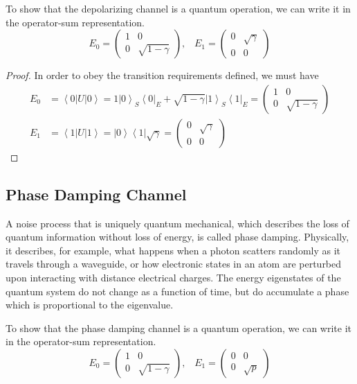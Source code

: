 \documentclass{article}
\newcommand{\ket}[1]{\ensuremath{\left|#1\right\rangle}}
\newcommand{\bra}[1]{\ensuremath{\left\langle#1\right|}}
\begin{document}
      \begin{lemma}
        To show that the depolarizing channel is a quantum operation, we can write it in the operator-sum representation. 
        \begin{equation}
          E_0 = \begin{pmatrix} 1 & 0 \\ 0 & \sqrt{1 - \gamma} \end{pmatrix}, \;\;\; E_1 = \begin{pmatrix} 0 & \sqrt{\gamma} \\ 0 & 0 \end{pmatrix}
        \end{equation}
      \end{lemma}
      \begin{proof}
        In order to obey the transition requirements defined, we must have 
        \begin{align}
          E_0 & = \bra{0} U \ket{0} = 1 \ket{0}_S \bra{0}_E + \sqrt{1 - \gamma} \ket{1}_S \bra{1}_E = \begin{pmatrix} 1 & 0 \\ 0 & \sqrt{1 - \gamma} \end{pmatrix} \\ 
          E_1 & = \bra{1} U \ket{1} = \ket{0} \bra{1} \sqrt{\gamma} = \begin{pmatrix} 0 & \sqrt{\gamma} \\ 0 & 0 \end{pmatrix}
        \end{align}
      \end{proof}

  \subsection{Phase Damping Channel}

    A noise process that is uniquely quantum mechanical, which describes the loss of quantum information without loss of energy, is called phase damping. Physically, it describes, for example, what happens when a photon scatters randomly as it travels through a waveguide, or how electronic states in an atom are perturbed upon interacting with distance electrical charges. The energy eigenstates of the quantum system do not change as a function of time, but do accumulate a phase which is proportional to the eigenvalue. 

    \begin{definition}
      To show that the phase damping channel is a quantum operation, we can write it in the operator-sum representation. 
      \begin{equation}
        E_0 = \begin{pmatrix} 1 & 0 \\ 0 & \sqrt{1 - \gamma} \end{pmatrix}, \;\;\; E_1 = \begin{pmatrix} 0 & 0 \\ 0 & \sqrt{p} \end{pmatrix}
      \end{equation}
    \end{definition}
\end{document}
